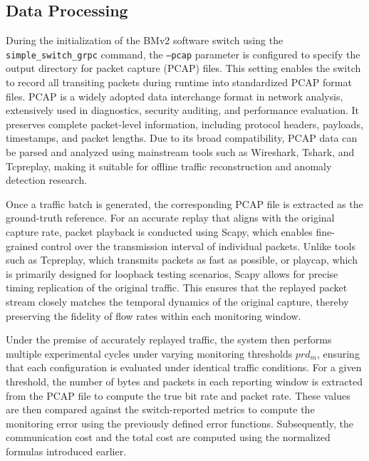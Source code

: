 \subsection{Data Processing}
\label{subsection33}

\noindent

During the initialization of the BMv2 software switch using the \texttt{simple\_switch\_grpc} command, the \texttt{--pcap} parameter is configured to specify the output directory for packet capture (PCAP) files. 
This setting enables the switch to record all transiting packets during runtime into standardized PCAP format files. 
PCAP is a widely adopted data interchange format in network analysis, extensively used in diagnostics, security auditing, and performance evaluation. 
It preserves complete packet-level information, including protocol headers, payloads, timestamps, and packet lengths. 
Due to its broad compatibility, PCAP data can be parsed and analyzed using mainstream tools such as Wireshark, Tshark, and Tcpreplay, making it suitable for offline traffic reconstruction and anomaly detection research.

Once a traffic batch is generated, the corresponding PCAP file is extracted as the ground-truth reference. 
For an accurate replay that aligns with the original capture rate, packet playback is conducted using Scapy, which enables fine-grained control over the transmission interval of individual packets. 
Unlike tools such as Tcpreplay, which transmits packets as fast as possible, or playcap, which is primarily designed for loopback testing scenarios, Scapy allows for precise timing replication of the original traffic. 
This ensures that the replayed packet stream closely matches the temporal dynamics of the original capture, thereby preserving the fidelity of flow rates within each monitoring window.

Under the premise of accurately replayed traffic, the system then performs multiple experimental cycles under varying monitoring thresholds $prd_m$, ensuring that each configuration is evaluated under identical traffic conditions. 
For a given threshold, the number of bytes and packets in each reporting window is extracted from the PCAP file to compute the true bit rate and packet rate. 
These values are then compared against the switch-reported metrics to compute the monitoring error using the previously defined error functions. Subsequently, the communication cost and the total cost are computed using the normalized formulas introduced earlier.

